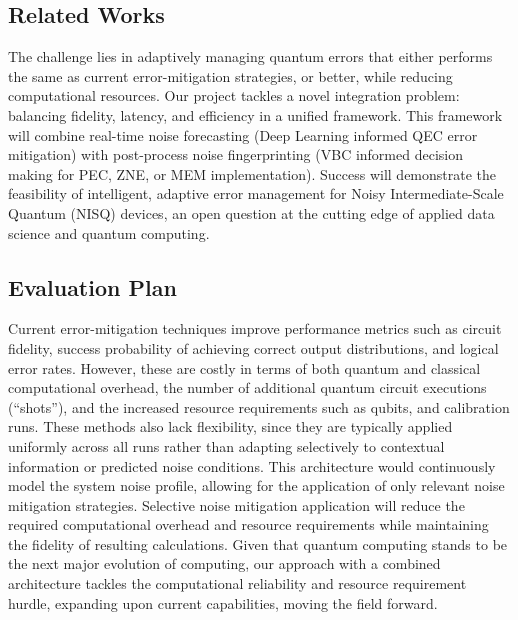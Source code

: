 \documentclass[12pt]{article}
\begin{document}
\subsection*{Related Works}
The challenge lies in adaptively managing quantum errors that either performs the same as current error-mitigation strategies, or better, while reducing computational resources. 
Our project tackles a novel integration problem: balancing fidelity, latency, and efficiency in a unified framework.
This framework will combine real-time noise forecasting (Deep Learning informed QEC error mitigation) with post-process noise fingerprinting (VBC informed decision making for PEC, ZNE, or MEM implementation).
Success will demonstrate the feasibility of intelligent, adaptive error management for Noisy Intermediate-Scale Quantum (NISQ) devices, an open question at the cutting edge of applied data science and quantum computing.

\subsection*{Evaluation Plan}

Current error-mitigation techniques improve performance metrics such as circuit fidelity, success probability of achieving correct output distributions, and logical error rates.
However, these are costly in terms of both quantum and classical computational overhead, the number of additional quantum circuit executions (“shots”), and the increased resource requirements such as qubits, and calibration runs. 
These methods also lack flexibility, since they are typically applied uniformly across all runs rather than adapting selectively to contextual information or predicted noise conditions.
This architecture would continuously model the system noise profile, allowing for the application of only relevant noise mitigation strategies.
Selective noise mitigation application will reduce the required computational overhead and resource requirements while maintaining the fidelity of resulting calculations.
Given that quantum computing stands to be the next major evolution of computing, our approach with a combined architecture tackles the computational reliability and resource requirement hurdle, expanding upon current capabilities, moving the field forward.
\end{document}
